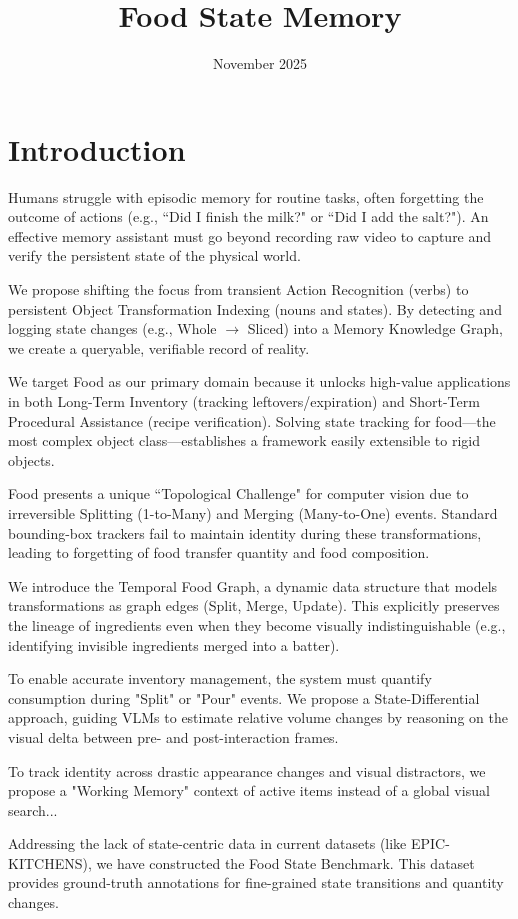 \documentclass{article}
\title{Food State Memory}
\date{November 2025}
\begin{document}
\maketitle

\section{Introduction}

Humans struggle with episodic memory for routine tasks, often forgetting the outcome of actions (e.g., ``Did I finish the milk?" or ``Did I add the salt?"). An effective memory assistant must go beyond recording raw video to capture and verify the persistent state of the physical world.

We propose shifting the focus from transient Action Recognition (verbs) to persistent Object Transformation Indexing (nouns and states). By detecting and logging state changes (e.g., Whole $\to$ Sliced) into a Memory Knowledge Graph, we create a queryable, verifiable record of reality.

We target Food as our primary domain because it unlocks high-value applications in both Long-Term Inventory (tracking leftovers/expiration) and Short-Term Procedural Assistance (recipe verification). Solving state tracking for food—the most complex object class—establishes a framework easily extensible to rigid objects.

Food presents a unique ``Topological Challenge" for computer vision due to irreversible Splitting (1-to-Many) and Merging (Many-to-One) events. Standard bounding-box trackers fail to maintain identity during these transformations, leading to forgetting of food transfer quantity and food composition.

We introduce the Temporal Food Graph, a dynamic data structure that models transformations as graph edges (Split, Merge, Update). This explicitly preserves the lineage of ingredients even when they become visually indistinguishable (e.g., identifying invisible ingredients merged into a batter).

To enable accurate inventory management, the system must quantify consumption during "Split" or "Pour" events. We propose a State-Differential approach, guiding VLMs to estimate relative volume changes by reasoning on the visual delta between pre- and post-interaction frames.

To track identity across drastic appearance changes and visual distractors, we propose  a "Working Memory" context of active items instead of a global visual search...

Addressing the lack of state-centric data in current datasets (like EPIC-KITCHENS), we have constructed the Food State Benchmark. This dataset provides ground-truth annotations for fine-grained state transitions and quantity changes.



\end{document}

